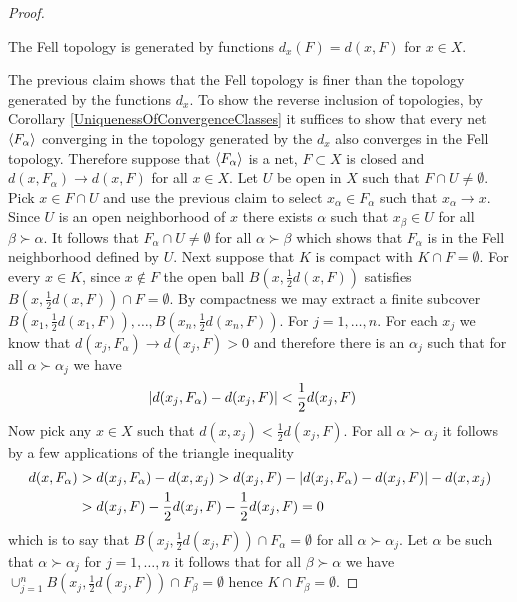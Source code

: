 \begin{proof}
\begin{clm}The Fell topology is generated by functions $d_x(F) = d(x,F)$ for $x \in X$.
\end{clm}
The previous claim shows that the Fell topology is finer than the topology generated by the functions $d_x$.  To show the reverse inclusion of topologies, by Corollary \ref{UniquenessOfConvergenceClasses} it suffices to show that every net $\langle F_{\alpha} \rangle$ converging in the topology generated by the $d_x$ also converges in the Fell topology.
Therefore suppose that $\langle F_{\alpha} \rangle$ is a net, $F \subset X$ is closed and $d(x, F_\alpha) \to d(x,F)$ for all $x \in X$.   Let $U$ be open in $X$ such that $F \cap U \neq \emptyset$.  Pick $x \in F \cap U$ and use the previous claim to select $x_\alpha \in F_\alpha$ such that $x_\alpha \to x$.  Since $U$ is an open neighborhood of $x$ there exists $\alpha$ such that $x_\beta \in U$ for all $\beta \succ \alpha$.  It follows that $F_\alpha \cap U \neq \emptyset$ for all $\alpha \succ \beta$ which shows that $F_\alpha$ is in the Fell neighborhood defined by $U$.  Next suppose that $K$ is compact with $K \cap F = \emptyset$.  For every $x \in K$, since $x \notin F$ the open ball $B(x, \frac{1}{2}d(x,F))$ satisfies $B(x,\frac{1}{2}d(x,F)) \cap F = \emptyset$.   By compactness we may extract a finite
subcover $B(x_1, \frac{1}{2}d(x_1,F)), \dotsc, B(x_n,\frac{1}{2}d(x_n, F))$.  For $j=1, \dotsc, n$.  For each $x_j$ we know that $d(x_j, F_\alpha) \to d(x_j, F) > 0$ and therefore there is an $\alpha_j$ such that for all $\alpha \succ \alpha_j$ we have
\begin{align*}
\left \vert d(x_j, F_\alpha) - d(x_j, F) \right \vert &< \frac{1}{2}d(x_j, F)
\end{align*}
Now pick any $x \in X$ such that $d(x,x_j) < \frac{1}{2} d(x_j, F)$.  For all $\alpha \succ \alpha_j$ it follows by a few applications of the triangle inequality
\begin{align*}
d(x, F_\alpha) &> d(x_j, F_\alpha) - d(x,x_j) > d(x_j, F) - \left \vert d(x_j, F_\alpha) - d(x_j, F) \right \vert - d(x,x_j) \\
&> d(x_j, F) - \frac{1}{2}d(x_j, F) - \frac{1}{2} d(x_j, F) = 0
\end{align*}
which is to say that $B(x_j, \frac{1}{2}d(x_j,F)) \cap F_\alpha = \emptyset$ for all $\alpha \succ \alpha_j$.  Let $\alpha$ be such that $\alpha \succ \alpha_j$ for $j=1, \dotsc, n$ it follows that for
all  $\beta \succ \alpha$ we have $\cup_{j=1}^n B(x_j, \frac{1}{2}d(x_j,F)) \cap F_\beta = \emptyset$ hence $K \cap F_\beta = \emptyset$.



\end{proof}
